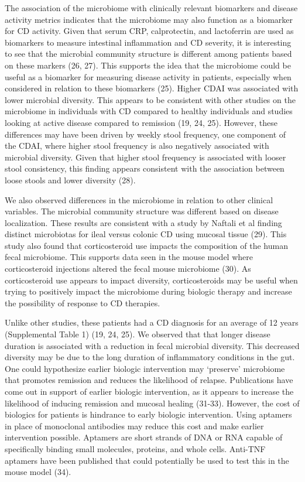 \documentclass[11pt,]{article}
\begin{document}
The association of the microbiome with clinically relevant biomarkers
and disease activity metrics indicates that the microbiome may also
function as a biomarker for CD activity. Given that serum CRP,
calprotectin, and lactoferrin are used as biomarkers to measure
intestinal inflammation and CD severity, it is interesting to see that
the microbial community structure is different among patients based on
these markers (26, 27). This supports the idea that the microbiome could
be useful as a biomarker for measuring disease activity in patients,
especially when considered in relation to these biomarkers (25). Higher
CDAI was associated with lower microbial diversity. This appears to be
consistent with other studies on the microbiome in individuals with CD
compared to healthy individuals and studies looking at active disease
compared to remission (19, 24, 25). However, these differences may have
been driven by weekly stool frequency, one component of the CDAI, where
higher stool frequency is also negatively associated with microbial
diversity. Given that higher stool frequency is associated with looser
stool consistency, this finding appears consistent with the association
between loose stools and lower diversity (28).

We also observed differences in the microbiome in relation to other
clinical variables. The microbial community structure was different
based on disease localization. These results are consistent with a study
by Naftali et al finding distinct microbiotas for ileal versus colonic
CD using mucosal tissue (29). This study also found that corticosteroid
use impacts the composition of the human fecal microbiome. This supports
data seen in the mouse model where corticosteroid injections altered the
fecal mouse microbiome (30). As corticosteroid use appears to impact
diversity, corticosteroids may be useful when trying to positively
impact the microbiome during biologic therapy and increase the
possibility of response to CD therapies.

Unlike other studies, these patients had a CD diagnosis for an average
of 12 years (Supplemental Table 1) (19, 24, 25). We observed that that
longer disease duration is associated with a reduction in fecal
microbial diversity. This decreased diversity may be due to the long
duration of inflammatory conditions in the gut. One could hypothesize
earlier biologic intervention may `preserve' microbiome that promotes
remission and reduces the likelihood of relapse. Publications have come
out in support of earlier biologic intervention, as it appears to
increase the likelihood of inducing remission and mucosal healing
(31-33). However, the cost of biologics for patients is hindrance to
early biologic intervention. Using aptamers in place of monoclonal
antibodies may reduce this cost and make earlier intervention possible.
Aptamers are short strands of DNA or RNA capable of specifically binding
small molecules, proteins, and whole cells. Anti-TNF aptamers have been
published that could potentially be used to test this in the mouse model
(34).
\end{document}
